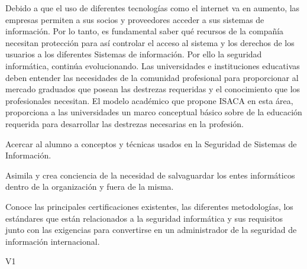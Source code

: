 \begin{syllabus}
\begin{justification}
    Debido a que el uso de diferentes tecnologías como el internet va en aumento, las empresas permiten a sus socios y proveedores acceder a sus sistemas de información. Por lo tanto, es fundamental saber qué recursos de la compañía necesitan protección para así controlar el acceso al sistema y los derechos de los usuarios a los diferentes Sistemas de información.  Por ello la seguridad informática, continúa evolucionando. Las universidades e instituciones educativas deben entender las necesidades de la comunidad profesional para proporcionar al mercado graduados que posean las destrezas requeridas y el conocimiento que los profesionales necesitan. El modelo académico que propone  ISACA en esta área, proporciona a las universidades un marco conceptual básico sobre de la educación requerida para desarrollar las destrezas necesarias en la profesión.
    \end{justification}
    
    \begin{goals}
    \item Acercar al alumno a conceptos y técnicas usados en la Seguridad de Sistemas de Información.
    \item Asimila y crea conciencia de la necesidad de salvaguardar los entes informáticos dentro de la organización y fuera de la misma.
    \item Conoce las principales certificaciones existentes, las diferentes metodologías, los estándares que están relacionados a la seguridad informática y sus requisitos junto con las exigencias para convertirse en un administrador de la seguridad de información internacional.
    \end{goals}
    
    \begin{outcomes}{V1}
        \item {}
        \item {}
        \item {}
        \item {}
        \item {}
        \item {}
        \item {}
        \item {}
    \end{outcomes}
    

\end{syllabus}

